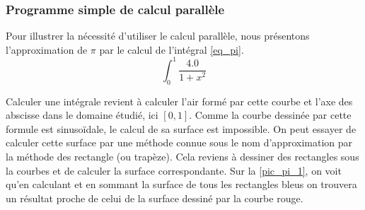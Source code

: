         
        \subsubsection{Programme simple de calcul parallèle}\label{sec:exemple_pi}
            
            Pour illustrer la nécessité d'utiliser le calcul parallèle, nous présentons l'approximation de $\pi$ par le calcul de l'intégral \ref{eq_pi}.
            \begin{equation}
            \label{eq_pi}
            \int_{0}^{1} \frac{4.0}{1 + x^{2}}
            \end{equation}
            
            Calculer une intégrale revient à calculer l'air formé par cette courbe et l'axe des abscisse dans le domaine étudié, ici $[0,1]$. Comme la courbe dessinée par cette formule est sinusoïdale, le calcul de sa surface est impossible. On peut essayer de calculer cette surface par une méthode connue sous le nom d'approximation par la méthode des rectangle (ou trapèze).
            Cela reviens à dessiner des rectangles sous la courbes et de calculer la surface correspondante. Sur la \autoref{pic_pi_1}, on voit qu'en calculant et en sommant la surface de tous les rectangles bleus on trouvera un résultat proche de celui de la surface dessiné par la courbe rouge. 
                
